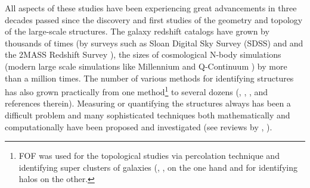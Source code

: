 All aspects of these studies have been experiencing great advancements in  three decades passed since the discovery and first studies of the geometry and topology  of the large-scale structures. The galaxy redshift catalogs have grown by thousands of times (by surveys such as Sloan Digital Sky Survey (SDSS) \citealt{Tegmark2003} and \citealt{Albareti2016} and the 2MASS Redshift Survey \citealt{Huchra2012}), the sizes of cosmological N-body simulations (modern large scale simulations like Millennium \citealt{Springel2005b} and Q-Continuum \citealt{Heitmann2015}) by more than a million times. The number of various methods for identifying  structures has also grown practically from  one method\footnote{FOF was used for the topological studies via percolation technique and identifying super clusters of galaxies (\citealt{Zeldovich1982}, \citealt{Shandarin1983}, \citealt{Shandarin1983b} on the one hand and for identifying halos \citealt{Davis1985} on the other.}  to several dozens (\citealt{Colberg2008}, \citealt{Knebe2011a}, \citealt{Onions2012}, \citealt{Knebe2013} and references therein). Measuring or quantifying  the structures always has  been a difficult problem and many sophisticated  techniques both mathematically and computationally have been proposed and investigated (see reviews by \citealt{Weygaert2008c}, \citealt{Weygaert2008}).


